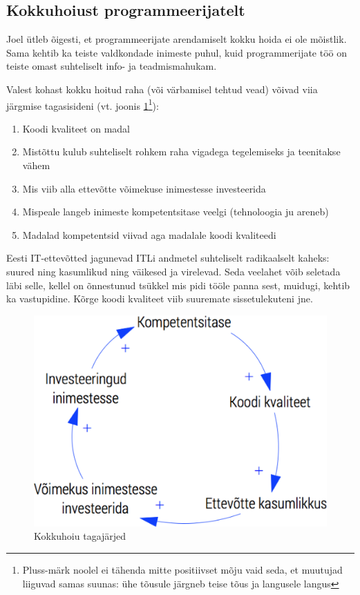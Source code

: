 \documentclass{article}
\begin{document}
\subsection{Kokkuhoiust programmeerijatelt}
\label{sec:kokkuhoid}
Joel ütleb õigesti, et programmeerijate arendamiselt kokku hoida ei ole mõistlik. Sama kehtib ka teiste valdkondade inimeste puhul, kuid programmerijate töö on teiste omast suhteliselt info- ja teadmismahukam.

Valest kohast kokku hoitud raha (või värbamisel tehtud vead) võivad viia järgmise tagasisideni (vt. joonis \ref{fig:kokkuhoid}\footnote{Pluss-märk noolel ei tähenda mitte positiivset mõju vaid seda, et muutujad liiguvad samas suunas: ühe tõusule järgneb teise tõus ja langusele langus}):
\begin{enumerate}
	\item Koodi kvaliteet on madal
	\item Mistõttu kulub suhteliselt rohkem raha vigadega tegelemiseks ja teenitakse vähem
	\item Mis viib alla ettevõtte võimekuse inimestesse investeerida
	\item Mispeale langeb inimeste kompetentsitase veelgi (tehnoloogia ju areneb)
	\item Madalad kompetentsid viivad aga madalale koodi kvaliteedi
\end{enumerate}

Eesti IT-ettevõtted jagunevad ITLi andmetel suhteliselt radikaalselt kaheks: suured ning kasumlikud ning väikesed ja virelevad. Seda veelahet võib seletada läbi selle, kellel on õnnestunud tsükkel mis pidi tööle panna sest, muidugi, kehtib ka vastupidine. Kõrge koodi kvaliteet viib suuremate sissetulekuteni jne.

\begin{figure}[htp]
	\begin{center}
		\includegraphics[width=.6\textwidth]{kvaliteet.png}
		\caption{Kokkuhoiu tagajärjed}
		\label{fig:kokkuhoid}
	\end{center}
\end{figure}
\end{document}
